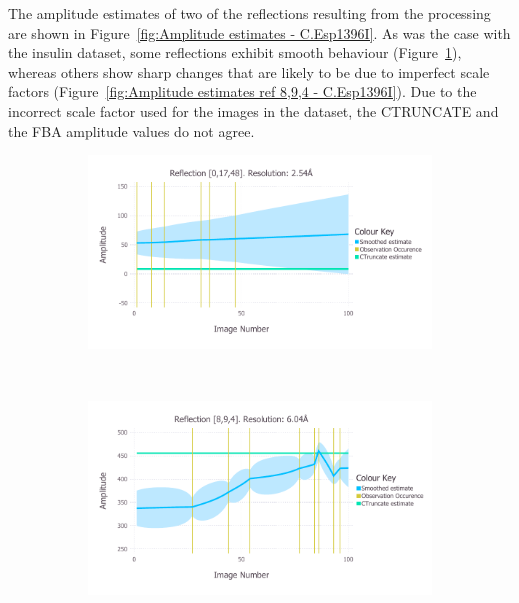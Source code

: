 The amplitude estimates of two of the reflections resulting from the processing are shown in Figure~\ref{fig:Amplitude estimates - C.Esp1396I}.
As was the case with the insulin dataset, some reflections exhibit smooth behaviour (Figure~\ref{fig:Amplitude estimates ref 0,17,48 - C.Esp1396I}), whereas others show sharp changes that are likely to be due to imperfect scale factors (Figure~\ref{fig:Amplitude estimates ref 8,9,4 - C.Esp1396I}).
Due to the incorrect scale factor used for the images in the dataset, the CTRUNCATE and the FBA amplitude values do not agree.
\begin{figure}
    \centering
    \begin{subfigure}[b]{1.0\textwidth}
            \centering
            \includegraphics[width=\textwidth]{figures/datared/SmoothedPlot_0,17,48_res3.pdf}
            \caption{}
            \label{fig:Amplitude estimates ref 0,17,48 - C.Esp1396I}
    \end{subfigure}
    \\
    \begin{subfigure}[b]{1.0\textwidth}
            \centering
            \includegraphics[width=\textwidth]{figures/datared/SmoothedPlot_8,9,4_res6.pdf}

\end{subfigure}
\end{figure}
